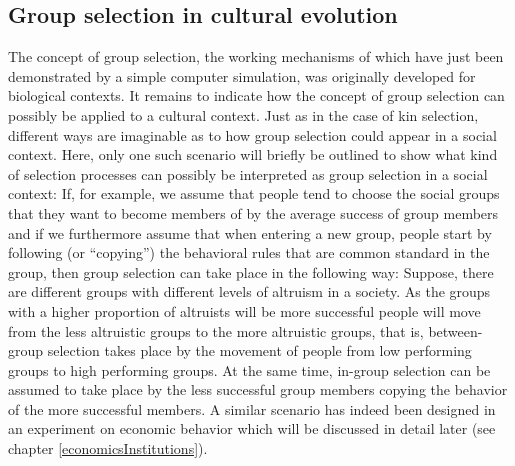\subsection{Group selection in cultural evolution}
\label{culturalGroupSelection}
The concept of group selection, the working mechanisms of which have just been
demonstrated by a simple computer simulation, was originally developed for
biological contexts. It remains to indicate how the concept of group selection
can possibly be applied to a cultural context. Just as in the case of kin
selection, different ways are imaginable as to how group selection could
appear in a social context. Here, only one such scenario will briefly be
outlined to show what kind of selection processes can possibly be interpreted
as group selection in a social context: If, for example, we assume that people
tend to choose the social groups that they want to become members of by the
average success of group members and if we furthermore assume that when
entering a new group, people start by following (or ``copying'') the behavioral
rules that are common standard in the group, then group selection can take
place in the following way: Suppose, there are different groups with different
levels of altruism in a society. As the groups with a higher proportion of
altruists will be more successful people will move from the less altruistic
groups to the more altruistic groups, that is, between-group selection takes
place by the movement of people from low performing groups to high performing
groups. At the same time, in-group selection can be assumed to take place by
the less successful group members copying the behavior of the more successful
members. A similar scenario has indeed been designed in an experiment on
economic behavior which will be discussed in detail later (see chapter
\ref{economicsInstitutions}).

